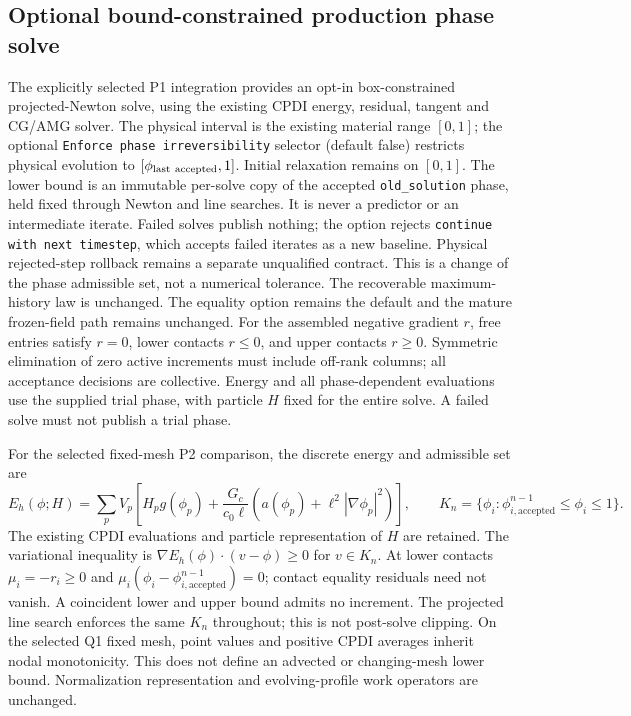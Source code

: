 \documentclass[11pt]{article}
\begin{document}
\subsection{Optional bound-constrained production phase solve}
The explicitly selected P1 integration provides an opt-in box-constrained
projected-Newton solve, using the existing CPDI energy, residual, tangent and
CG/AMG solver. The physical interval is the existing material range $[0,1]$;
the optional \texttt{Enforce phase irreversibility} selector (default false)
restricts physical evolution to $[\phi_{\rm last\ accepted},1]$. Initial relaxation
remains on $[0,1]$. The lower bound is an immutable per-solve copy of the accepted
\texttt{old\_solution} phase, held fixed through Newton and line searches. It is
never a predictor or an intermediate iterate. Failed solves publish nothing;
the option rejects \texttt{continue with next timestep}, which accepts failed
iterates as a new baseline. Physical rejected-step rollback remains a separate
unqualified contract. This
is a change of the phase admissible set, not a numerical tolerance. The
recoverable maximum-history law is unchanged. The equality option remains the default
and the mature frozen-field path remains unchanged. For the assembled negative
gradient $r$, free entries satisfy $r=0$, lower contacts $r\leq0$, and upper
contacts $r\geq0$. Symmetric elimination of zero active increments must include
off-rank columns; all acceptance decisions are collective. Energy and all
phase-dependent evaluations use the supplied trial phase, with particle $H$
fixed for the entire solve. A failed solve must not publish a trial phase.

For the selected fixed-mesh P2 comparison, the discrete energy and admissible set are
\[
 E_h(\phi;H)=\sum_p V_p\left[H_p g(\phi_p)
 +\frac{G_c}{c_0\ell}\left(a(\phi_p)+\ell^2|\nabla\phi_p|^2\right)\right],
 \qquad K_n=\{\phi_i:\phi^{n-1}_{i,\mathrm{accepted}}\leq\phi_i\leq1\}.
\]
The existing CPDI evaluations and particle representation of $H$ are retained.
The variational inequality is $\nabla E_h(\phi)\cdot(v-\phi)\geq0$ for $v\in K_n$.
At lower contacts $\mu_i=-r_i\geq0$ and
$\mu_i(\phi_i-\phi^{n-1}_{i,\mathrm{accepted}})=0$; contact equality residuals need
not vanish. A coincident lower and upper bound admits no increment. The projected
line search enforces the same $K_n$ throughout; this is not post-solve clipping.
On the selected Q1 fixed mesh, point values and positive CPDI averages inherit
nodal monotonicity. This does not define an advected or changing-mesh lower bound.
Normalization representation and evolving-profile work operators are unchanged.
\end{document}
